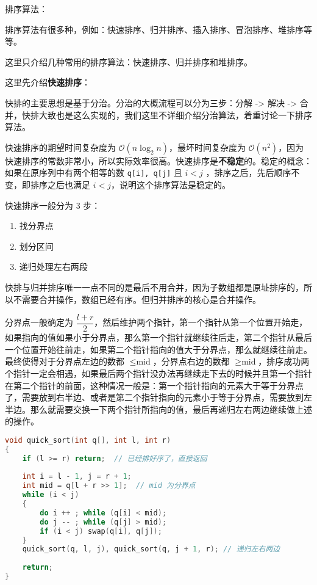 
排序算法：

排序算法有很多种，例如：快速排序、归并排序、插入排序、冒泡排序、堆排序等等。

这里只介绍几种常用的排序算法：快速排序、归并排序和堆排序。

这里先介绍\textbf{快速排序}：

快排的主要思想是基于分治。分治的大概流程可以分为三步：分解 -> 解决 -> 合并，快排大致也是这么实现的，我们这里不详细介绍分治算法，着重讨论一下排序算法。

快速排序的期望时间复杂度为 $\mathcal{O}(n \log_2 n)$，最坏时间复杂度为 $\mathcal{O}(n^2)$，因为快速排序的常数非常小，所以实际效率很高。快速排序是\textbf{不稳定}的。稳定的概念：如果在原序列中有两个相等的数 \verb|q[i], q[j]| 且 $i < j$ ，排序之后，先后顺序不变，即排序之后也满足 $i < j$，说明这个排序算法是稳定的。

快速排序一般分为 $3$ 步：
\begin{enumerate}
\item 找分界点
\item 划分区间
\item 递归处理左右两段
\end{enumerate}

快排与归并排序唯一一点不同的是最后不用合并，因为子数组都是原址排序的，所以不需要合并操作，数组已经有序。但归并排序的核心是合并操作。

分界点一般确定为 $\dfrac{l+r}{2}$，然后维护两个指针，第一个指针从第一个位置开始走，如果指向的值如果小于分界点，那么第一个指针就继续往后走，第二个指针从最后一个位置开始往前走，如果第二个指针指向的值大于分界点，那么就继续往前走。最终使得对于分界点左边的数都 $\leq \text{mid}$，分界点右边的数都 $\geq \text{mid}$，排序成功两个指针一定会相遇，如果最后两个指针没办法再继续走下去的时候并且第一个指针在第二个指针的前面，这种情况一般是：第一个指针指向的元素大于等于分界点了，需要放到右半边、或者是第二个指针指向的元素小于等于分界点，需要放到左半边。那么就需要交换一下两个指针所指向的值，最后再递归左右两边继续做上述的操作。


\begin{lstlisting}[language=cpp]
void quick_sort(int q[], int l, int r)
{
    if (l >= r) return;  // 已经排好序了，直接返回
		
    int i = l - 1, j = r + 1;
    int mid = q[l + r >> 1];  // mid 为分界点
    while (i < j)
    {
        do i ++ ; while (q[i] < mid);
        do j -- ; while (q[j] > mid);
        if (i < j) swap(q[i], q[j]);
    }
    quick_sort(q, l, j), quick_sort(q, j + 1, r); // 递归左右两边
    
    return;
}

\end{lstlisting}


